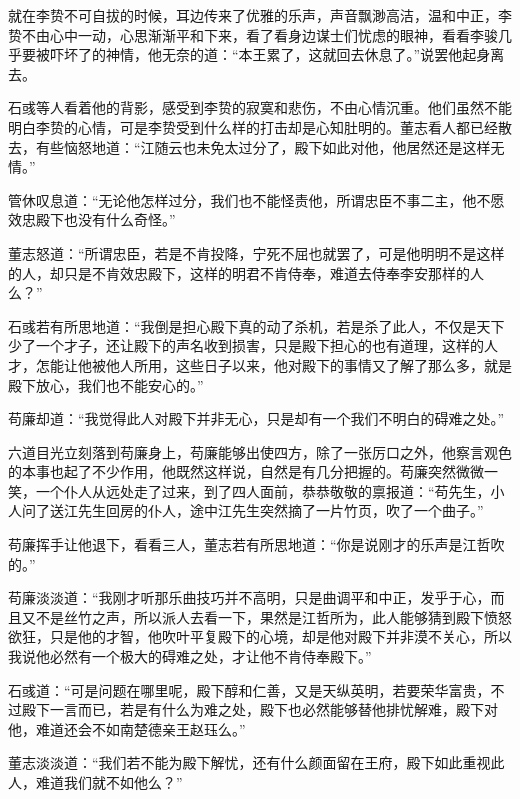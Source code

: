 就在李贽不可自拔的时候，耳边传来了优雅的乐声，声音飘渺高洁，温和中正，李贽不由心中一动，心思渐渐平和下来，看了看身边谋士们忧虑的眼神，看看李骏几乎要被吓坏了的神情，他无奈的道：“本王累了，这就回去休息了。”说罢他起身离去。

石彧等人看着他的背影，感受到李贽的寂寞和悲伤，不由心情沉重。他们虽然不能明白李贽的心情，可是李贽受到什么样的打击却是心知肚明的。董志看人都已经散去，有些恼怒地道：“江随云也未免太过分了，殿下如此对他，他居然还是这样无情。”

管休叹息道：“无论他怎样过分，我们也不能怪责他，所谓忠臣不事二主，他不愿效忠殿下也没有什么奇怪。”

董志怒道：“所谓忠臣，若是不肯投降，宁死不屈也就罢了，可是他明明不是这样的人，却只是不肯效忠殿下，这样的明君不肯侍奉，难道去侍奉李安那样的人么？”

石彧若有所思地道：“我倒是担心殿下真的动了杀机，若是杀了此人，不仅是天下少了一个才子，还让殿下的声名收到损害，只是殿下担心的也有道理，这样的人才，怎能让他被他人所用，这些日子以来，他对殿下的事情又了解了那么多，就是殿下放心，我们也不能安心的。”

苟廉却道：“我觉得此人对殿下并非无心，只是却有一个我们不明白的碍难之处。”

六道目光立刻落到苟廉身上，苟廉能够出使四方，除了一张厉口之外，他察言观色的本事也起了不少作用，他既然这样说，自然是有几分把握的。苟廉突然微微一笑，一个仆人从远处走了过来，到了四人面前，恭恭敬敬的禀报道：“苟先生，小人问了送江先生回房的仆人，途中江先生突然摘了一片竹页，吹了一个曲子。”

苟廉挥手让他退下，看看三人，董志若有所思地道：“你是说刚才的乐声是江哲吹的。”

苟廉淡淡道：“我刚才听那乐曲技巧并不高明，只是曲调平和中正，发乎于心，而且又不是丝竹之声，所以派人去看一下，果然是江哲所为，此人能够猜到殿下愤怒欲狂，只是他的才智，他吹叶平复殿下的心境，却是他对殿下并非漠不关心，所以我说他必然有一个极大的碍难之处，才让他不肯侍奉殿下。”

石彧道：“可是问题在哪里呢，殿下醇和仁善，又是天纵英明，若要荣华富贵，不过殿下一言而已，若是有什么为难之处，殿下也必然能够替他排忧解难，殿下对他，难道还会不如南楚德亲王赵珏么。”

董志淡淡道：“我们若不能为殿下解忧，还有什么颜面留在王府，殿下如此重视此人，难道我们就不如他么？”

